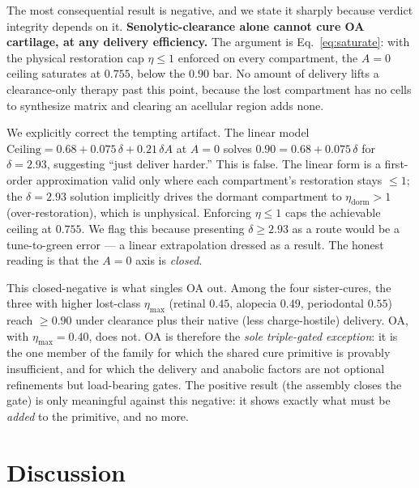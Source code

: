 \documentclass[11pt,a4paper]{article}
\begin{document}
The most consequential result is negative, and we state it sharply because verdict
integrity depends on it. \textbf{Senolytic-clearance alone cannot cure OA
cartilage, at any delivery efficiency.} The argument is Eq.~\eqref{eq:saturate}:
with the physical restoration cap $\eta\le1$ enforced on every compartment, the
$A=0$ ceiling saturates at $0.755$, below the $0.90$ bar. No amount of delivery
lifts a clearance-only therapy past this point, because the lost compartment has no
cells to synthesize matrix and clearing an acellular region adds none.

We explicitly correct the tempting artifact. The linear model
$\mathrm{Ceiling}=0.68+0.075\,\delta+0.21\,\delta A$ at $A=0$ solves
$0.90=0.68+0.075\,\delta$ for $\delta=2.93$, suggesting ``just deliver harder.''
This is false. The linear form is a first-order approximation valid only where
each compartment's restoration stays $\le1$; the $\delta=2.93$ solution implicitly
drives the dormant compartment to $\eta_{\mathrm{dorm}}>1$ (over-restoration),
which is unphysical. Enforcing $\eta\le1$ caps the achievable ceiling at $0.755$.
We flag this because presenting $\delta\ge2.93$ as a route would be a
tune-to-green error --- a linear extrapolation dressed as a result. The honest
reading is that the $A=0$ axis is \emph{closed}.

This closed-negative is what singles OA out. Among the four sister-cures, the three
with higher lost-class $\eta_{\max}$ (retinal $0.45$, alopecia $0.49$, periodontal
$0.55$) reach $\ge0.90$ under clearance plus their native (less charge-hostile)
delivery. OA, with $\eta_{\max}=0.40$, does not. OA is therefore the \emph{sole
triple-gated exception}: it is the one member of the family for which the shared
cure primitive is provably insufficient, and for which the delivery and anabolic
factors are not optional refinements but load-bearing gates. The
positive result (the assembly closes the gate) is only meaningful against this
negative: it shows exactly what must be \emph{added} to the primitive, and no more.

\section{Discussion}
\end{document}
